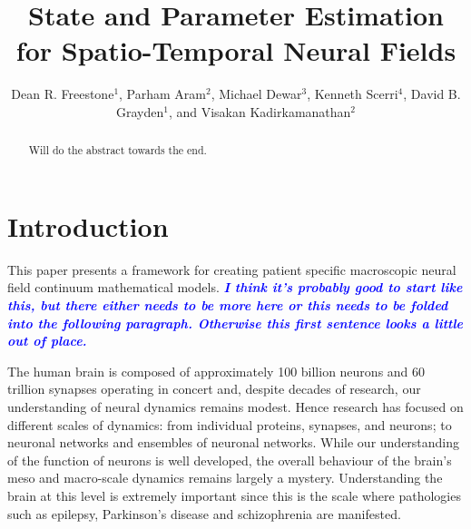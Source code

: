\documentclass[12pt]{iopart}
\newcommand{\todo}[1]{\textsf{\emph{\textbf{\textcolor{blue}{#1}}}}}
\begin{document}
\title[State and Parameter Estimation for Spatio-Temporal Neural Fields]{State and Parameter Estimation for Spatio-Temporal Neural Fields}

\author{Dean R. Freestone$^1$, Parham Aram$^2$, Michael Dewar$^3$, Kenneth Scerri$^4$, David B. Grayden$^1$, and Visakan Kadirkamanathan$^2$}

\address{$^1$ Department of Electrical and Electronic Engineering, University of Melbourne, Melbourne, Vic, 3010 Australia} \address{$^2$ Department of Automatic Control and Systems Engineering, University of Sheffield, Mappin Street, Sheffield, S1 3JD, UK} \address{$^3$ Department of Applied Physics and Applied Mathematics, Columbia University, US} \address{$^4$ Ken's}  
\begin{abstract}
	Will do the abstract towards the end. 
\end{abstract}

\maketitle

\section{Introduction} This paper presents a framework for creating patient specific macroscopic neural field continuum mathematical models. \todo{I think it's probably good to start like this, but there either needs to be more here or this needs to be folded into the following paragraph. Otherwise this first sentence looks a little out of place.}

The human brain is composed of approximately 100 billion neurons and 60 trillion synapses operating in concert and, despite decades of research, our understanding of neural dynamics remains modest. Hence research has focused on different scales of dynamics: from individual proteins, synapses, and neurons; to neuronal networks and ensembles of neuronal networks. While our understanding of the function of neurons is well developed, the overall behaviour of the brain's meso and macro-scale dynamics remains largely a mystery. Understanding the brain at this level is extremely important since this is the scale where pathologies such as epilepsy, Parkinson's disease and schizophrenia are manifested.
\end{document}
